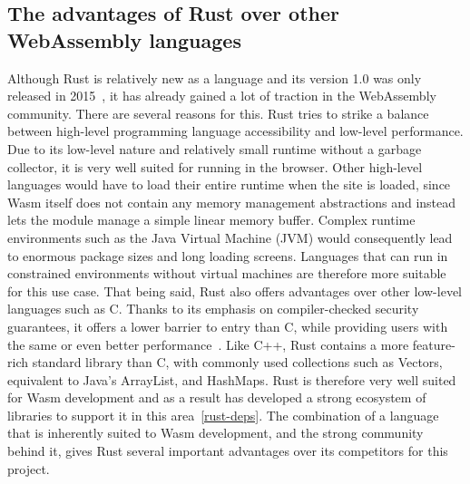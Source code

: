 \subsection{The advantages of Rust over other WebAssembly languages} \label{rust-vs-other-wasm}
Although Rust is relatively new as a language and its version 1.0 was only released in 2015~\cite{rustreleases}, it has already gained a lot of traction in the WebAssembly community.
There are several reasons for this. Rust tries to strike a balance between high-level programming language accessibility and low-level performance.
Due to its low-level nature and relatively small runtime without a garbage collector, it is very well suited for running in the browser.
Other high-level languages would have to load their entire runtime when the site is loaded, since Wasm itself does not contain any memory management abstractions and instead lets the module manage a simple linear memory buffer.
Complex runtime environments such as the Java Virtual Machine (JVM) would consequently lead to enormous package sizes and long loading screens.
Languages that can run in constrained environments without virtual machines are therefore more suitable for this use case.
That being said, Rust also offers advantages over other low-level languages such as C. Thanks to its emphasis on compiler-checked security guarantees, it offers a lower barrier to entry than C, while providing users with the same or even better performance~\cite{medin2021performance}.
Like C++, Rust contains a more feature-rich standard library than C, with commonly used collections such as Vectors, equivalent to Java's ArrayList, and HashMaps.
Rust is therefore very well suited for Wasm development and as a result has developed a strong ecosystem of libraries to support it in this area~\ref{rust-deps}.
The combination of a language that is inherently suited to Wasm development, and the strong community behind it, gives Rust several important advantages over its competitors for this project.


